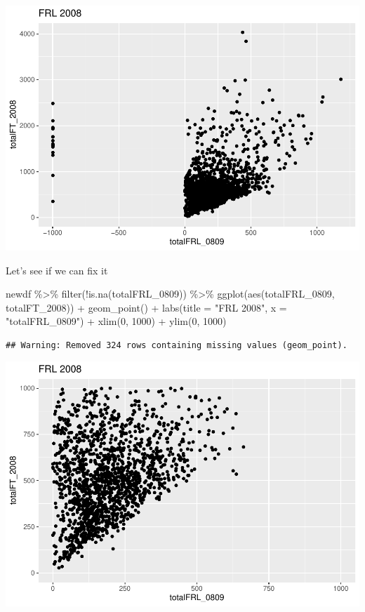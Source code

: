 \documentclass[
]{book}
\newenvironment{Shaded}{\begin{snugshade}}{\end{snugshade}}
\newcommand{\AttributeTok}[1]{\textcolor[rgb]{0.77,0.63,0.00}{#1}}
\newcommand{\DecValTok}[1]{\textcolor[rgb]{0.00,0.00,0.81}{#1}}
\newcommand{\FunctionTok}[1]{\textcolor[rgb]{0.00,0.00,0.00}{#1}}
\newcommand{\NormalTok}[1]{#1}
\newcommand{\SpecialCharTok}[1]{\textcolor[rgb]{0.00,0.00,0.00}{#1}}
\newcommand{\StringTok}[1]{\textcolor[rgb]{0.31,0.60,0.02}{#1}}
\begin{document}
\includegraphics{test_course_notes_files/figure-latex/unnamed-chunk-55-1.pdf}

Let's see if we can fix it

\begin{Shaded}
\begin{Highlighting}[]
\NormalTok{newdf }\SpecialCharTok{\%\textgreater{}\%} 
  \FunctionTok{filter}\NormalTok{(}\SpecialCharTok{!}\FunctionTok{is.na}\NormalTok{(totalFRL\_0809)) }\SpecialCharTok{\%\textgreater{}\%}
  \FunctionTok{ggplot}\NormalTok{(}\FunctionTok{aes}\NormalTok{(totalFRL\_0809, totalFT\_2008)) }\SpecialCharTok{+}
  \FunctionTok{geom\_point}\NormalTok{() }\SpecialCharTok{+}
  \FunctionTok{labs}\NormalTok{(}\AttributeTok{title =} \StringTok{"FRL 2008"}\NormalTok{, }
       \AttributeTok{x =} \StringTok{"totalFRL\_0809"}\NormalTok{) }\SpecialCharTok{+}
  \FunctionTok{xlim}\NormalTok{(}\DecValTok{0}\NormalTok{, }\DecValTok{1000}\NormalTok{) }\SpecialCharTok{+}
  \FunctionTok{ylim}\NormalTok{(}\DecValTok{0}\NormalTok{, }\DecValTok{1000}\NormalTok{)}
\end{Highlighting}
\end{Shaded}

\begin{verbatim}
## Warning: Removed 324 rows containing missing values (geom_point).
\end{verbatim}

\includegraphics{test_course_notes_files/figure-latex/unnamed-chunk-56-1.pdf}
\end{document}
